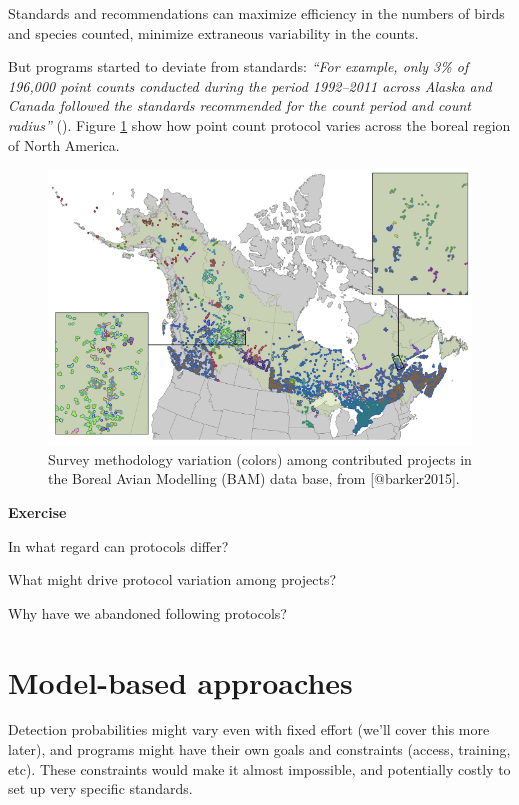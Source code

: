 \documentclass[12pt,]{book}
\let\BeginKnitrBlock\begin \let\EndKnitrBlock\end
\begin{document}
Standards and recommendations can
maximize efficiency in the numbers of birds and species counted,
minimize extraneous variability in the counts.

But programs started to deviate from standards:
\emph{``For example, only 3\% of 196,000 point counts conducted during the period
1992--2011 across Alaska and Canada followed the standards recommended for the count period and count radius''} (\citep{matsuoka2014}).
Figure \ref{fig:intro-2} show how point count protocol varies
across the boreal region of North America.

\begin{figure}
\includegraphics[width=0.8\linewidth]{images/barker-2015-fig-2} \caption{Survey methodology variation (colors) among contributed projects in the Boreal Avian Modelling (BAM) data base, from [@barker2015].}\label{fig:intro-2}
\end{figure}

\BeginKnitrBlock{rmdexercise}
\textbf{Exercise}

In what regard can protocols differ?

What might drive protocol variation among projects?

Why have we abandoned following protocols?
\EndKnitrBlock{rmdexercise}

\hypertarget{model-based-approaches}{%
\section{Model-based approaches}\label{model-based-approaches}}

Detection probabilities might vary even with fixed effort
(we'll cover this more later),
and programs might have their own goals and constraints (access, training, etc).
These constraints would make it almost impossible, and potentially costly
to set up very specific standards.
\end{document}
